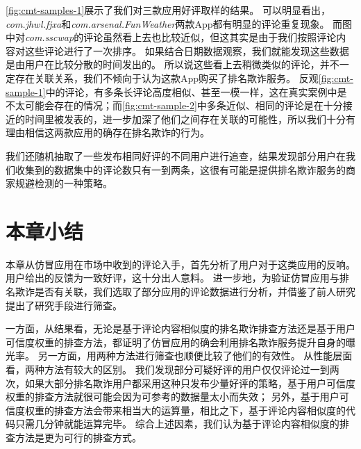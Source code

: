 \autoref{fig:cmt-samples-1}展示了我们对三款应用好评取样的结果。
可以明显看出，\emph{com.jhwl.fjxa}和\emph{com.arsenal.FunWeather}两款App都有明显的评论重复现象。
而图中对\emph{com.sscwap}的评论虽然看上去也比较近似，但这其实是由于我们按照评论内容对这些评论进行了一次排序。
如果结合日期数据观察，我们就能发现这些数据是由用户在比较分散的时间发出的。
所以说这些看上去稍微类似的评论，并不一定存在关联关系，我们不倾向于认为这款App购买了排名欺诈服务。
反观\autoref{fig:cmt-sample-1}中的评论，有多条长评论高度相似、甚至一模一样，这在真实案例中是不太可能会存在的情况；而\autoref{fig:cmt-sample-2}中多条近似、相同的评论是在十分接近的时间里被发表的，进一步加深了他们之间存在关联的可能性，所以我们十分有理由相信这两款应用的确存在排名欺诈的行为。

我们还随机抽取了一些发布相同好评的不同用户进行追查，结果发现部分用户在我们收集到的数据集中的评论数只有一到两条，这很有可能是提供排名欺诈服务的商家规避检测的一种策略。

\section{本章小结}
本章从仿冒应用在市场中收到的评论入手，首先分析了用户对于这类应用的反响。
用户给出的反馈为一致好评，这十分出人意料。
进一步地，为验证仿冒应用与排名欺诈是否有关联，我们选取了部分应用的评论数据进行分析，并借鉴了前人研究提出了研究手段进行筛查。

一方面，从结果看，无论是基于评论内容相似度的排名欺诈排查方法还是基于用户可信度权重的排查方法，都证明了仿冒应用的确会利用排名欺诈服务提升自身的曝光率。
另一方面，用两种方法进行筛查也顺便比较了他们的有效性。
从性能层面看，两种方法有较大的区别。
我们发现部分可疑好评的用户仅仅评论过一到两次，如果大部分排名欺诈用户都采用这种只发布少量好评的策略，基于用户可信度权重的排查方法就很可能会因为可参考的数据量太小而失效；
另外，基于用户可信度权重的排查方法会带来相当大的运算量，相比之下，基于评论内容相似度的代码只需几分钟就能运算完毕。
综合上述因素，我们认为基于评论内容相似度的排查方法是更为可行的排查方式。
